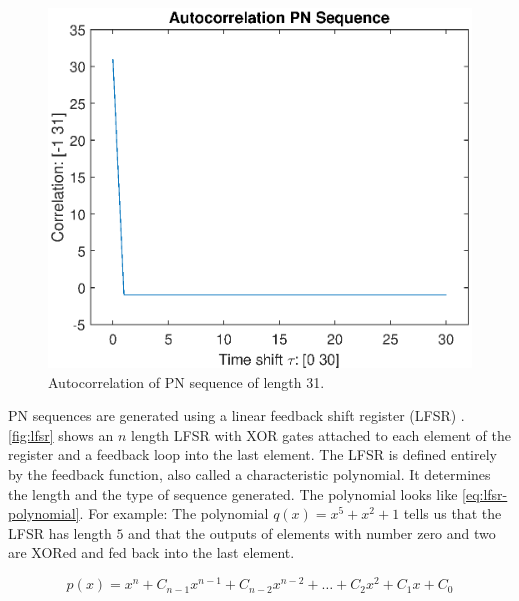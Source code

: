 \begin{figure}[t]
	\centering
	\includegraphics[width=\textwidth]{chapters/cdma-chapters/codes/autocorr-pn.eps}
	\caption{Autocorrelation of PN sequence of length 31.}
	\label{fig:autocorr-pn}
\end{figure}





PN sequences are generated using a linear feedback shift register (LFSR) \cite{Wang:1988:LFS:52007.52024}.
\autoref{fig:lfsr} shows an $n$ length LFSR with XOR gates attached to each element of the register and a feedback loop into the last element. 
The LFSR is defined entirely by the feedback function, also called a characteristic polynomial.
It determines the length and the type of sequence generated.
The polynomial looks like \autoref{eq:lfsr-polynomial}.
For example: The polynomial $q(x) = x^5 + x^2 + 1$ tells us that the LFSR has length $5$ and that the outputs of elements with number zero and two are XORed and fed back into the last element. 

\begin{equation}
	\label{eq:lfsr-polynomial}
	p(x) = x^n + C_{n-1} x^{n-1}  + C_{n-2} x^{n-2} + \dotsc + C_{2} x^{2}  + C_{1} x  + C_{0}
\end{equation}

